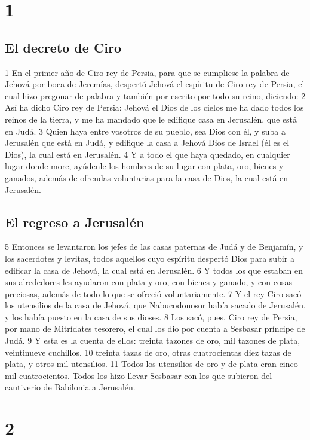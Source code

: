 
\chapter{1}

\section*{El decreto de Ciro}

1 En el primer año de Ciro rey de Persia, para que se cumpliese la palabra de Jehová por boca de Jeremías, despertó Jehová el espíritu de Ciro rey de Persia, el cual hizo pregonar de palabra y también por escrito por todo su reino, diciendo:
2 Así ha dicho Ciro rey de Persia: Jehová el Dios de los cielos me ha dado todos los reinos de la tierra, y me ha mandado que le edifique casa en Jerusalén, que está en Judá.
3 Quien haya entre vosotros de su pueblo, sea Dios con él, y suba a Jerusalén que está en Judá, y edifique la casa a Jehová Dios de Israel (él es el Dios), la cual está en Jerusalén.
4 Y a todo el que haya quedado, en cualquier lugar donde more, ayúdenle los hombres de su lugar con plata, oro, bienes y ganados, además de ofrendas voluntarias para la casa de Dios, la cual está en Jerusalén.

\section*{El regreso a Jerusalén}

5 Entonces se levantaron los jefes de las casas paternas de Judá y de Benjamín, y los sacerdotes y levitas, todos aquellos cuyo espíritu despertó Dios para subir a edificar la casa de Jehová, la cual está en Jerusalén.
6 Y todos los que estaban en sus alrededores les ayudaron con plata y oro, con bienes y ganado, y con cosas preciosas, además de todo lo que se ofreció voluntariamente.
7 Y el rey Ciro sacó los utensilios de la casa de Jehová, que Nabucodonosor había sacado de Jerusalén, y los había puesto en la casa de sus dioses.
8 Los sacó, pues, Ciro rey de Persia, por mano de Mitrídates tesorero, el cual los dio por cuenta a Sesbasar príncipe de Judá.
9 Y esta es la cuenta de ellos: treinta tazones de oro, mil tazones de plata, veintinueve cuchillos,
10 treinta tazas de oro, otras cuatrocientas diez tazas de plata, y otros mil utensilios.
11 Todos los utensilios de oro y de plata eran cinco mil cuatrocientos. Todos los hizo llevar Sesbasar con los que subieron del cautiverio de Babilonia a Jerusalén.

\chapter{2}

